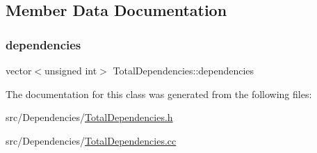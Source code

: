 \subsection{Member Data Documentation}
\mbox{\label{class_total_dependencies_a94825b4f782c30dfebf69dd2eba0bb1f}} 
\subsubsection{\texorpdfstring{dependencies}{dependencies}}
{\footnotesize\ttfamily vector$<$unsigned int$>$ Total\+Dependencies\+::dependencies\hspace{0.3cm}{\ttfamily [private]}}



The documentation for this class was generated from the following files\+:\begin{DoxyCompactItemize}
\item 
src/\+Dependencies/\hyperlink{_total_dependencies_8h}{Total\+Dependencies.\+h}\item 
src/\+Dependencies/\hyperlink{_total_dependencies_8cc}{Total\+Dependencies.\+cc}\end{DoxyCompactItemize}
